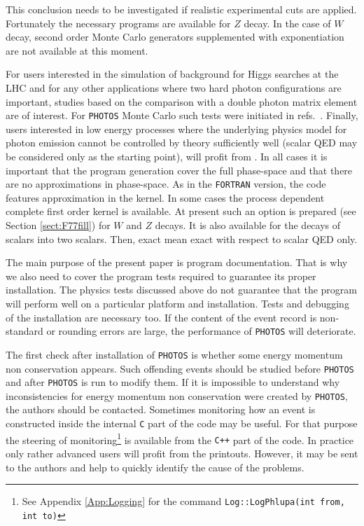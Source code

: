 \documentclass[]{Photos_interface_design}
\begin{document}
This conclusion needs to be investigated if   
realistic experimental 
cuts are applied. Fortunately the necessary programs are available for $Z$ decay.
In the case of $W$ decay, second order Monte Carlo generators supplemented with 
exponentiation are not available at this moment.
 
For users interested in the simulation of
background for Higgs searches at the LHC and for any other applications where 
two hard photon configurations are important, studies based on the comparison with 
a double photon matrix element are of 
interest. For {\tt PHOTOS} Monte Carlo such tests were initiated 
in refs.~\cite{Barberio:1993qi,RichterWas:1994ep,RichterWas:1993ta}.
Finally, users interested in low energy processes where the underlying physics model 
for photon emission cannot be controlled by theory sufficiently well
(scalar QED may 
be considered only as the starting point), will profit 
from \cite{Nanava:2006vv,Nanava:2009vg}. In all cases it is important that
the  program generation cover the full phase-space and that there are no 
approximations in phase-space. As in the {\tt FORTRAN} version, the code 
features approximation in the kernel. In some cases the process dependent 
complete first order 
kernel is available. At present such an option is prepared 
(see Section \ref{sect:F77fill}) for $W$ and $Z$ decays. It is also available for the  decays of scalars 
into two scalars. Then, exact mean exact with respect to scalar QED only. 

The main purpose of the present paper is program documentation. That is why
we also need to cover the program tests required to guarantee its proper installation.
The physics tests discussed above 
do not guarantee that the program will perform well on a particular platform and installation. Tests and debugging of the installation
are necessary too.  If the content of the event record is non-standard or rounding errors are large, the performance of {\tt PHOTOS} will deteriorate.


The first check after installation of {\tt PHOTOS} is whether some energy momentum non 
conservation appears. Such offending events should be studied
before {\tt PHOTOS}  and after {\tt PHOTOS} is run to modify them.
If it is impossible to understand why inconsistencies for energy momentum non 
conservation were created by {\tt PHOTOS}, the authors should be contacted. Sometimes
monitoring how an event is constructed inside the internal {\tt C} part of the code
may be useful. For that purpose the steering of monitoring\footnote{See Appendix \ref{App:Logging}
for the command {\tt Log::LogPhlupa(int from, int to)}}
 is
available from the {\tt C++} part of the code. In practice only rather
 advanced users will profit from the printouts. However, it may be sent to
the authors and help to quickly identify the cause of the problems.
\end{document}
